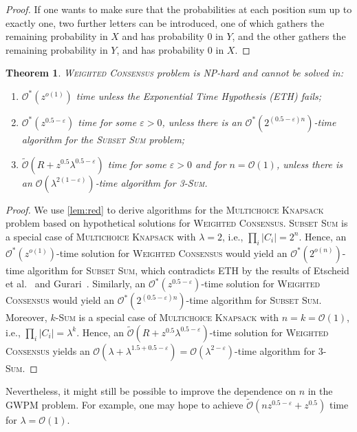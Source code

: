 \documentclass{article}
\theoremstyle{plain}
\newtheorem{theorem}{Theorem}[section]
\theoremstyle{definition}
\newcommand{\MK}{\textsc{Multichoice Knapsack}\xspace}
\newcommand{\GWPM}{\textsc{GWPM}\xspace}
\newcommand{\WC}{\textsc{Weighted Consensus}\xspace}
\newcommand{\SubsetSum}{\textsc{Subset Sum}\xspace}
\newcommand{\Sum}{\textsc{Sum}\xspace}
\newcommand{\Oh}{\mathcal{O}}
\newcommand{\Ohtilde}{\tilde{\mathcal{O}}}
\newcommand{\Ohstar}{\mathcal{O}^*}
\begin{document}
\begin{proof}
    If one wants to make sure that the probabilities at each position sum up to exactly one, two further letters can be introduced,
    one of which gathers the remaining probability in $X$ and has probability 0 in $Y$, and the other gathers
    the remaining probability in $Y$, and has probability 0 in $X$. 
   \end{proof} 

  \begin{theorem}\label{thm:lb}
  \WC problem is NP-hard and cannot be solved in:
  \begin{enumerate}
   \item $\Ohstar(z^{o(1)})$ time unless the Exponential Time Hypothesis (ETH) fails;
   \item $\Ohstar(z^{0.5-\varepsilon})$ time for some $\varepsilon>0$, unless there is an $\Ohstar(2^{(0.5-\varepsilon)n})$-time algorithm for the \SubsetSum problem;
    \item $\Ohtilde(R+z^{0.5}\lambda^{0.5-\varepsilon})$ time for some $\varepsilon>0$ and for $n=\Oh(1)$, unless
    there is an $\Oh(\lambda^{2(1-\varepsilon)})$-time algorithm for 3-\Sum.
    \end{enumerate}
  \end{theorem}
    \begin{proof}
    We use \cref{lem:red} to derive algorithms for the \MK problem based on hypothetical solutions for \WC.
    \SubsetSum is a special case of \MK with $\lambda=2$, i.e., $\prod_{i}|C_i|=2^n$. Hence,
    an $\Ohstar(z^{o(1)})$-time solution for \WC would yield an $\Ohstar(2^{o(n)})$-time algorithm for \SubsetSum,
    which contradicts ETH by the results of Etscheid et al.~\cite{DBLP:conf/mfcs/EtscheidKMR15} and Gurari~\cite{DBLP:books/daglib/0069796}.
    Similarly, an $\Ohstar(z^{0.5-\varepsilon})$-time solution for \WC would yield an $\Ohstar(2^{(0.5-\varepsilon)n})$-time algorithm for \SubsetSum. 
    Moreover, $k$-\Sum is a special case of \MK with $n=k=\Oh(1)$, i.e., $\prod_{i}|C_i|=\lambda^{k}$.
    Hence, an $\Ohtilde(R+z^{0.5}\lambda^{0.5-\varepsilon})$-time solution for \WC yields
    an $\Oh(\lambda + \lambda^{1.5+0.5-\varepsilon})=\Oh(\lambda^{2-\varepsilon})$-time algorithm for 3-\Sum.
    \end{proof}

    Nevertheless, it might still be possible to improve the dependence on $n$ in the \GWPM problem.
    For example, one may hope to achieve $\Ohtilde(nz^{0.5-\varepsilon}+z^{0.5})$ time for $\lambda=\Oh(1)$.
\end{document}
